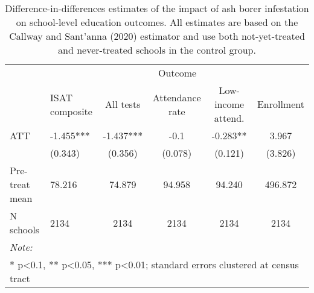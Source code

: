 \begin{table}[!h]

\caption{\label{tab:school-educ-table}Difference-in-differences estimates of the impact of ash borer infestation on school-level education outcomes. All estimates are based on the Callway and Sant'anna (2020) estimator and use both not-yet-treated and never-treated schools in the control group.}
\centering
\begin{tabular}[t]{llcccc}
\toprule
\multicolumn{1}{c}{ } & \multicolumn{5}{c}{Outcome} \\
\cmidrule(l{3pt}r{3pt}){2-6}
  & ISAT composite & All tests & Attendance rate & Low-income attend. & Enrollment\\
\midrule
ATT & -1.455*** & -1.437*** & -0.1 & -0.283** & 3.967\\
 & (0.343) & (0.356) & (0.078) & (0.121) & (3.826)\\
\midrule
Pre-treat mean & 78.216 & 74.879 & 94.958 & 94.240 & 496.872\\
N schools & 2134 & 2134 & 2134 & 2134 & 2134\\
\bottomrule
\multicolumn{6}{l}{\rule{0pt}{1em}\textit{Note: }}\\
\multicolumn{6}{l}{\rule{0pt}{1em}* p<0.1, ** p<0.05, *** p<0.01; standard errors clustered at census tract}\\
\end{tabular}
\end{table}
